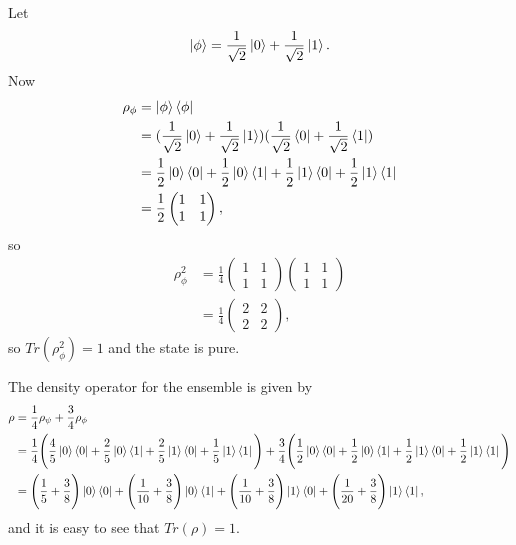 \documentclass[10pt]{article}
\begin{document}
Let 
\[
\ket{\phi} = \frac{1}{\sqrt{2}} \ket{0} + \frac{1}{\sqrt{2}} \ket{1}.
\]
Now
\begin{align*}
\rho_{\phi} &= \ket{\phi} \bra{\phi} \\
                  &= (\frac{1}{\sqrt{2}} \ket{0} + \frac{1}{\sqrt{2}} \ket{1})  (\frac{1}{\sqrt{2}} \bra{0} + \frac{1}{\sqrt{2}} \bra{1}) \\
                  &= \frac{1}{2} \ket{0} \bra{0} + \frac{1}{2} \ket{0} \bra{1} + \frac{1}{2} \ket{1} \bra{0} + \frac{1}{2} \ket{1} \bra{1} \\
                  &= \frac{1}{2} 
                  \begin{pmatrix}
                     1 & 1 \\
                     1 & 1
                  \end{pmatrix},
\end{align*}
so 
\begin{align*}
\rho_{\phi}^2 &= \frac{1}{4} 
\begin{pmatrix}
1 &  1 \\
1 & 1 
\end{pmatrix}
\begin{pmatrix}
1 &  1 \\
1 & 1 
\end{pmatrix} \\
&= \frac{1}{4} 
\begin{pmatrix}
2 & 2 \\
2 & 2
\end{pmatrix},
\end{align*}
so $Tr(\rho_{\phi}^2) = 1$ and the state is pure.

The density operator for the ensemble is given by 
\begin{align*}
\rho &= \frac{1}{4}\rho_{\psi} + \frac{3}{4}\rho_{\phi} \\
        &= \frac{1}{4} \Bigg( \frac{4}{5} \ket{0} \bra{0} + \frac{2}{5} \ket{0} \bra{1} + \frac{2}{5} \ket{1} \bra{0} + \frac{1}{5} \ket{1} \bra{1} \Bigg) + \frac{3}{4} \Bigg( \frac{1}{2} \ket{0} \bra{0} + \frac{1}{2} \ket{0} \bra{1} + \frac{1}{2} \ket{1} \bra{0} + \frac{1}{2} \ket{1} \bra{1} \Bigg) \\
        &= 
        \Bigg( \frac{1}{5} + \frac{3}{8} \Bigg) \ket{0} \bra{0} + \Bigg( \frac{1}{10} + \frac{3}{8}\Bigg) \ket{0} \bra{1} + \Bigg( \frac{1}{10} + \frac{3}{8} \Bigg) \ket{1} \bra{0} + \Bigg( \frac{1}{20} + \frac{3}{8} \Bigg)\ket{1} \bra{1},
\end{align*}
and it is easy to see that $Tr(\rho) = 1$.
\end{document}
